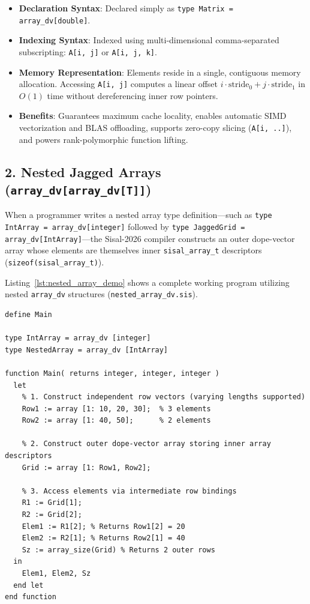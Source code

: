 \begin{itemize}
    \item \textbf{Declaration Syntax}: Declared simply as \texttt{type Matrix = array\_dv[double]}.
    \item \textbf{Indexing Syntax}: Indexed using multi-dimensional comma-separated subscripting: \texttt{A[i, j]} or \texttt{A[i, j, k]}.
    \item \textbf{Memory Representation}: Elements reside in a single, contiguous memory allocation. Accessing \texttt{A[i, j]} computes a linear offset $i \cdot \text{stride}_0 + j \cdot \text{stride}_1$ in $O(1)$ time without dereferencing inner row pointers.
    \item \textbf{Benefits}: Guarantees maximum cache locality, enables automatic SIMD vectorization and BLAS offloading, supports zero-copy slicing (\texttt{A[i, ..]}), and powers rank-polymorphic function lifting.
\end{itemize}

\subsection{2. Nested Jagged Arrays (\texttt{array\_dv[array\_dv[T]]})}
When a programmer writes a nested array type definition—such as \texttt{type IntArray = array\_dv[integer]} followed by \texttt{type JaggedGrid = array\_dv[IntArray]}—the Sisal-2026 compiler constructs an outer dope-vector array whose elements are themselves inner \texttt{sisal\_array\_t} descriptors (\texttt{sizeof(sisal\_array\_t)}).

Listing~\ref{lst:nested_array_demo} shows a complete working program utilizing nested \texttt{array\_dv} structures (\texttt{nested\_array\_dv.sis}).

\begin{lstlisting}[caption={Nested \texttt{array\_dv[array\_dv[T]]} Jagged Arrays (\texttt{nested\_array\_dv.sis})},label={lst:nested_array_demo}]
define Main

type IntArray = array_dv [integer]
type NestedArray = array_dv [IntArray]

function Main( returns integer, integer, integer )
  let
    % 1. Construct independent row vectors (varying lengths supported)
    Row1 := array [1: 10, 20, 30];  % 3 elements
    Row2 := array [1: 40, 50];      % 2 elements
    
    % 2. Construct outer dope-vector array storing inner array descriptors
    Grid := array [1: Row1, Row2];
    
    % 3. Access elements via intermediate row bindings
    R1 := Grid[1];
    R2 := Grid[2];
    Elem1 := R1[2]; % Returns Row1[2] = 20
    Elem2 := R2[1]; % Returns Row2[1] = 40
    Sz := array_size(Grid) % Returns 2 outer rows
  in
    Elem1, Elem2, Sz
  end let
end function
\end{lstlisting}

